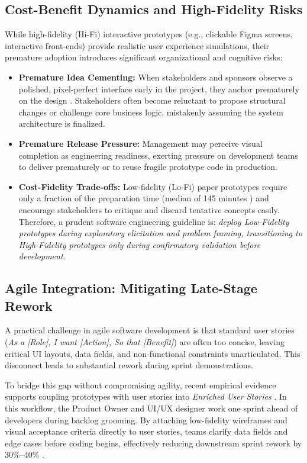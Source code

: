 \subsection{Cost-Benefit Dynamics and High-Fidelity Risks}
While high-fidelity (Hi-Fi) interactive prototypes (e.g., clickable Figma screens, interactive front-ends) provide realistic user experience simulations, their premature adoption introduces significant organizational and cognitive risks:
\begin{itemize}
    \item \textbf{Premature Idea Cementing:} When stakeholders and sponsors observe a polished, pixel-perfect interface early in the project, they anchor prematurely on the design \cite{bjarnason2023empirically, gupta2022strategic}. Stakeholders often become reluctant to propose structural changes or challenge core business logic, mistakenly assuming the system architecture is finalized.
    \item \textbf{Premature Release Pressure:} Management may perceive visual completion as engineering readiness, exerting pressure on development teams to deliver prematurely or to reuse fragile prototype code in production.
    \item \textbf{Cost-Fidelity Trade-offs:} Low-fidelity (Lo-Fi) paper prototypes require only a fraction of the preparation time (median of 145 minutes \cite{rueda2020requirements}) and encourage stakeholders to critique and discard tentative concepts easily. Therefore, a prudent software engineering guideline is: \textit{deploy Low-Fidelity prototypes during exploratory elicitation and problem framing, transitioning to High-Fidelity prototypes only during confirmatory validation before development}.
\end{itemize}

\subsection{Agile Integration: Mitigating Late-Stage Rework}
A practical challenge in agile software development is that standard user stories (\textit{As a [Role], I want [Action], So that [Benefit]}) are often too concise, leaving critical UI layouts, data fields, and non-functional constraints unarticulated. This disconnect leads to substantial rework during sprint demonstrations.

To bridge this gap without compromising agility, recent empirical evidence supports coupling prototypes with user stories into \textit{Enriched User Stories} \cite{acm2022proposal}. In this workflow, the Product Owner and UI/UX designer work one sprint ahead of developers during backlog grooming. By attaching low-fidelity wireframes and visual acceptance criteria directly to user stories, teams clarify data fields and edge cases before coding begins, effectively reducing downstream sprint rework by 30\%--40\% \cite{acm2022proposal}.

